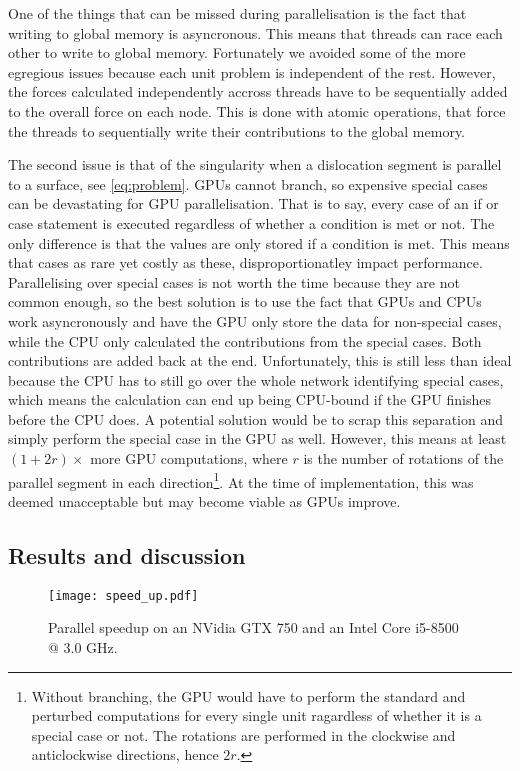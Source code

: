 One of the things that can be missed during parallelisation is the fact that writing to global memory is asyncronous. This means that threads can race each other to write to global memory. Fortunately we avoided some of the more egregious issues because each unit problem is independent of the rest. However, the forces calculated independently accross threads have to be sequentially added to the overall force on each node. This is done with atomic operations, that force the threads to sequentially write their contributions to the global memory.

The second issue is that of the singularity when a dislocation segment is parallel to a surface, see \cref{eq:problem}. GPUs cannot branch, so expensive special cases can be devastating for GPU parallelisation. That is to say, every case of an if or case statement is executed regardless of whether a condition is met or not. The only difference is that the values are only stored if a condition is met. This means that cases as rare yet costly as these, disproportionatley impact performance. Parallelising over special cases is not worth the time because they are not common enough, so the best solution is to use the fact that GPUs and CPUs work asyncronously and have the GPU only store the data for non-special cases, while the CPU only calculated the contributions from the special cases. Both contributions are added back at the end. Unfortunately, this is still less than ideal because the CPU has to still go over the whole network identifying special cases, which means the calculation can end up being CPU-bound if the GPU finishes before the CPU does. A potential solution would be to scrap this separation and simply perform the special case in the GPU as well. However, this means at least $(1 + 2r)\times$ more GPU computations, where $r$ is the number of rotations of the parallel segment in each direction\footnote{Without branching, the GPU would have to perform the standard and perturbed computations for every single unit ragardless of whether it is a special case or not. The rotations are performed in the clockwise and anticlockwise directions, hence $2r$.}. At the time of implementation, this was deemed unacceptable but may become viable as GPUs improve.

\subsection{Results and discussion}

\begin{figure}
  \centering
  \texttt{[image: speed\_up.pdf]}
  \caption[Parallel speedup on an NVidia GTX 750 and an Intel Core i5-8500 @ 3.0 GHz.]{Parallel speedup on an NVidia GTX 750 and an Intel Core i5-8500 @ 3.0 GHz.}
  \label{f:parallel}
\end{figure}


